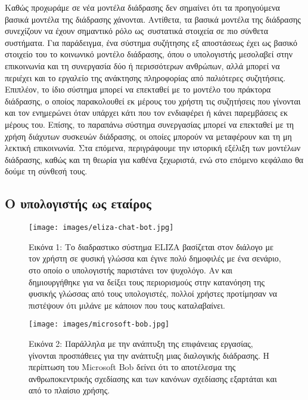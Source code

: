 \documentclass[
]{article}
\begin{document}
Καθώς προχωράμε σε νέα μοντέλα διάδρασης δεν σημαίνει ότι τα προηγούμενα
βασικά μοντέλα της διάδρασης χάνονται. Αντίθετα, τα βασικά μοντέλα της
διάδρασης συνεχίζουν να έχουν σημαντικό ρόλο ως~συστατικά στοιχεία σε
πιο σύνθετα συστήματα. Για παράδειγμα, ένα σύστημα συζήτησης εξ
αποστάσεως έχει ως βασικό στοιχείο του το κοινωνικό μοντέλο διάδρασης,
όπου ο υπολογιστής μεσολαβεί στην επικοινωνία και τη συνεργασία δύο ή
περισσότερων ανθρώπων, αλλά μπορεί να περιέχει και το εργαλείο της
ανάκτησης πληροφορίας από παλιότερες συζητήσεις. Επιπλέον, το ίδιο
σύστημα μπορεί να επεκταθεί με το μοντέλο του πράκτορα διάδρασης, ο
οποίος παρακολουθεί εκ μέρους του χρήστη τις συζητήσεις που γίνονται και
τον ενημερώνει όταν υπάρχει κάτι που τον ενδιαφέρει ή κάνει παρεμβάσεις
εκ μέρους του. Επίσης, το παραπάνω σύστημα συνεργασίας μπορεί να
επεκταθεί με τη χρήση διάχυτων συσκευών διάδρασης, οι οποίες μπορούν να
μεταφέρουν και τη μη λεκτική επικοινωνία. Στα επόμενα, περιγράφουμε την
ιστορική εξέλιξη των μοντέλων διάδρασης, καθώς και τη θεωρία για καθένα
ξεχωριστά, ενώ στο επόμενο κεφάλαιο θα δούμε τη σύνθεσή τους.

\hypertarget{ux3bf-ux3c5ux3c0ux3bfux3bbux3bfux3b3ux3b9ux3c3ux3c4ux3aeux3c2-ux3c9ux3c2-ux3b5ux3c4ux3b1ux3afux3c1ux3bfux3c2}{%
\subsection{Ο υπολογιστής ως
εταίρος}\label{ux3bf-ux3c5ux3c0ux3bfux3bbux3bfux3b3ux3b9ux3c3ux3c4ux3aeux3c2-ux3c9ux3c2-ux3b5ux3c4ux3b1ux3afux3c1ux3bfux3c2}}

\leavevmode{}%
\begin{figure}
\hypertarget{fig:eliza-chat-bot}{%
\centering
\texttt{[image: images/eliza-chat-bot.jpg]}
\caption{Εικόνα 1: Το διαδραστικο σύστημα ELIZA βασίζεται στον διάλογο
με τον χρήστη σε φυσική γλώσσα και έγινε πολύ δημοφιλές με ένα σενάριο,
στο οποίο ο υπολογιστής παριστάνει τον ψυχολόγο. Αν και δημιουργήθηκε
για να δείξει τους περιορισμούς στην κατανόηση της φυσικής γλώσσας από
τους υπολογιστές, πολλοί χρήστες προτίμησαν να πιστέψουν ότι μιλάνε με
κάποιον που τους καταλαβαίνει.}\label{fig:eliza-chat-bot}
}
\end{figure}

\leavevmode{}%
\begin{figure}
\hypertarget{fig:microsoft-bob}{%
\centering
\texttt{[image: images/microsoft-bob.jpg]}
\caption{Εικόνα 2: Παράλληλα με την ανάπτυξη της επιφάνειας εργασίας,
γίνονται προσπάθειες για την ανάπτυξη μιας διαλογικής διάδρασης. Η
περίπτωση του Microsoft Bob δείνει ότι το αποτέλεσμα της
ανθρωποκεντρικής σχεδίασης και των κανόνων σχεδίασης εξαρτάται και από
το πλαίσιο χρήσης.}\label{fig:microsoft-bob}
}
\end{figure}
\end{document}

